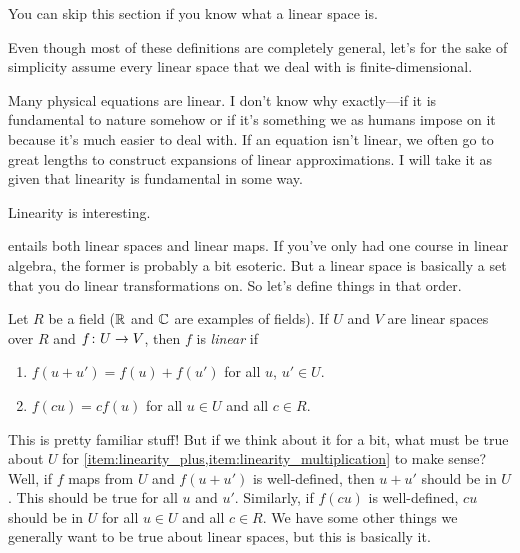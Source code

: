 \documentclass[english, 12pt]{article}
\begin{document}
You can skip this section if you know what a linear space is.

Even though most of these definitions are completely general, let's for the sake of simplicity assume every linear space that we deal with is finite-dimensional.

Many physical equations are linear.
I don't know why exactly---if it is fundamental to nature somehow or if it's something we as humans impose on it because it's much easier to deal with.
If an equation isn't linear, we often go to great lengths to construct expansions of linear approximations.
I will take it as given that linearity is fundamental in some way.
\begin{axiom}\label{ax:linearity}
	Linearity is interesting.
\end{axiom}
 entails both linear spaces and linear maps.
If you've only had one course in linear algebra, the former is probably a bit esoteric.
But a linear space is basically a set that you do linear transformations on.
So let's define things in that order.
\begin{definition}\label{def:linear_map}
	Let \(R\) be a field (\(\mathbb{R}\) and \(\mathbb{C}\) are examples of fields).
	If \(U\) and \(V\) are linear spaces over \(R\) and \(f \colon U \to V\), then \(f\) is \emph{linear} if
	\begin{enumerate}
		\item $f(u + u') = f(u) + f(u')$ for all \(u\), \(u' \in U\).%
		\label{item:linearity_plus}
		\item \(f(c u) = c f(u)\) for all \(u \in U\) and all \(c \in R\).%
		\label{item:linearity_multiplication}
	\end{enumerate}
\end{definition}
This is pretty familiar stuff!
But if we think about it for a bit, what must be true about \(U\) for \cref{item:linearity_plus,item:linearity_multiplication} to make sense?
Well, if \(f\) maps from \(U\) and \(f(u + u')\) is well-defined, then \(u + u'\) should be in \(U\).
This should be true for all \(u\) and \(u'\).
Similarly, if \(f(c u)\) is well-defined, \(c u\) should be in \(U\) for all \(u \in U\) and all \(c \in R\).
We have some other things we generally want to be true about linear spaces, but this is basically it.
\end{document}
